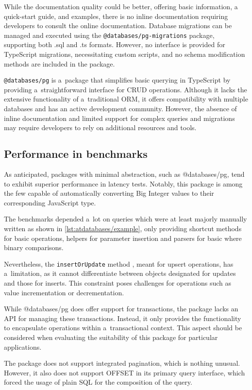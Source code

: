 While the documentation quality could be better, offering basic information, a
quick-start guide, and examples, there is no inline documentation requiring
developers to consult the online documentation. Database migrations can be
managed and executed using the \texttt{@databases/pg-migrations} package,
supporting both .sql and .ts formats. However, no interface is provided for
TypeScript migrations, necessitating custom scripts, and no schema modification
methods are included in the package.

\texttt{@databases/pg} is a~package that simplifies basic querying in TypeScript
by providing a~straightforward interface for CRUD operations. Although it lacks
the extensive functionality of a~traditional ORM, it offers compatibility with
multiple databases and has an active development community. However, the absence
of inline documentation and limited support for complex queries and migrations
may require developers to rely on additional resources and tools.

\subsection*{Performance in benchmarks}
As anticipated, packages with minimal abstraction, such as @databases/pg, tend
to exhibit superior performance in latency tests. Notably, this package is among
the few capable of automatically converting Big Integer values to their
corresponding JavaScript type.

The benchmarks depended a~lot on queries which were at least majorly manually
written as shown in \autoref{lst:atdatabases/example}, only providing shortcut
methods for basic operations, helpers for parameter insertion and parsers for
basic where binary comparisons.

Nevertheless, the \texttt{insertOrUpdate} method \cite{databases/pg}, meant for
upsert operations, has a~limitation, as it cannot differentiate between objects
designated for updates and those for inserts. This constraint poses challenges
for operations such as value incrementation or decrementation.

While @databases/pg does offer support for transactions, the package lacks an
API for managing these transactions. Instead, it only provides the functionality
to encapsulate operations within a~transactional context. This aspect should be
considered when evaluating the suitability of this package for particular
applications.

The package does not support integrated pagination, which is nothing unusual.
However, it also does not support OFFSET in its primary query interface, which
forced the usage of plain SQL for the composition of the query.
